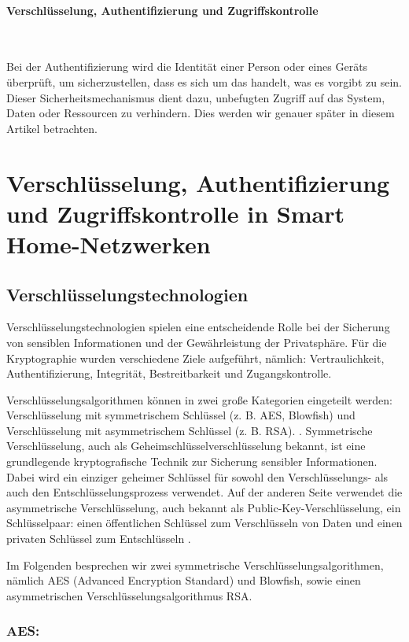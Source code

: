 \paragraph{Verschlüsselung, Authentifizierung und Zugriffskontrolle}
\

Bei der Authentifizierung wird die Identität einer Person oder eines Geräts überprüft, um sicherzustellen, dass es sich um das handelt, was es vorgibt zu sein. Dieser Sicherheitsmechanismus dient dazu, unbefugten Zugriff auf das System, Daten oder Ressourcen zu verhindern. Dies werden wir genauer  später in diesem Artikel betrachten.

\section{Verschlüsselung, Authentifizierung und Zugriffskontrolle in Smart Home-Netzwerken}
\subsection{Verschlüsselungstechnologien}

Verschlüsselungstechnologien spielen eine entscheidende Rolle bei der Sicherung von sensiblen Informationen und der Gewährleistung der Privatsphäre. 
Für die Kryptographie wurden verschiedene Ziele aufgeführt, nämlich: Vertraulichkeit, Authentifizierung, Integrität, Bestreitbarkeit und Zugangskontrolle. 

Verschlüsselungsalgorithmen können in zwei große Kategorien eingeteilt werden: Verschlüsselung mit symmetrischem Schlüssel (z. B. AES, Blowfish) und Verschlüsselung mit asymmetrischem Schlüssel (z. B. RSA).\cite{thambiraja2012survey} .
Symmetrische Verschlüsselung, auch als Geheimschlüsselverschlüsselung bekannt, ist eine grundlegende kryptografische Technik zur Sicherung sensibler Informationen. Dabei wird ein einziger geheimer Schlüssel für sowohl den Verschlüsselungs- als auch den Entschlüsselungsprozess verwendet.
Auf der anderen Seite verwendet die asymmetrische Verschlüsselung, auch bekannt als Public-Key-Verschlüsselung, ein Schlüsselpaar: einen öffentlichen Schlüssel zum Verschlüsseln von Daten und einen privaten Schlüssel zum Entschlüsseln \cite{khatoun2022cybersecurity}.

Im Folgenden besprechen wir zwei symmetrische Verschlüsselungsalgorithmen, nämlich AES (Advanced Encryption Standard) und Blowfish, sowie einen asymmetrischen Verschlüsselungsalgorithmus RSA.


\subsubsection{AES:}

